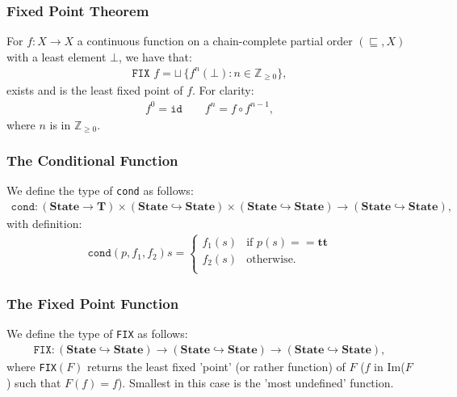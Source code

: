 \subsubsection{Fixed Point Theorem}

For $f : X \to X$ a continuous function on a chain-complete partial order
$(\sqsubseteq, X)$ with a least element $\bot$, we have that: \begin{gather*}
  \texttt{FIX } f = \sqcup \, \{f^n(\bot) : n \in \mathbb{Z}_{\geq 0}\},
\end{gather*} exists and is the least fixed point of $f$. For clarity: 
\begin{gather*}
  f^0 = \texttt{id} \qquad f^n = f \circ f^{n - 1},
\end{gather*} where $n$ is in $\mathbb{Z}_{\geq 0}$.

\subsubsection{The Conditional Function}

We define the type of \texttt{cond} as follows: \begin{gather*}
  \texttt{cond} : 
  (\textbf{State} \to \textbf{T}) \times
  (\textbf{State} \hookrightarrow \textbf{State}) \times
  (\textbf{State} \hookrightarrow \textbf{State}) \to
  (\textbf{State} \hookrightarrow \textbf{State}),
\end{gather*} with definition: \begin{gather*}
  \texttt{cond}(p, f_1, f_2)s = \begin{cases}
    f_1(s) & \text{if } p(s) == \textbf{tt} \\
    f_2(s) & \text{otherwise.} \\
  \end{cases}
\end{gather*}

\subsubsection{The Fixed Point Function}

We define the type of \texttt{FIX} as follows: \begin{gather*}
  \texttt{FIX} : 
  (\textbf{State} \hookrightarrow \textbf{State}) \to
  (\textbf{State} \hookrightarrow \textbf{State}) \to
  (\textbf{State} \hookrightarrow \textbf{State}),
\end{gather*} where \texttt{FIX}$(F)$ returns the least fixed 'point'
(or rather function) of $F$ ($f$ in Im($F$) such that $F(f) = f$). 
Smallest in this case is the 'most undefined' function.

